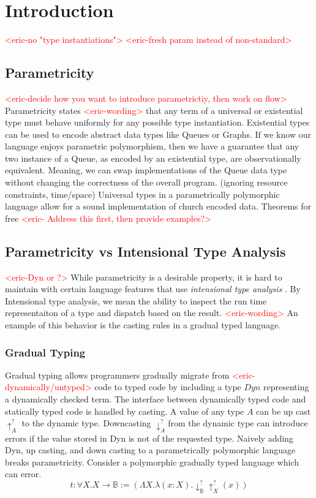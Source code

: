 \documentclass[acmsmall]{acmart}
\newcommand{\eric}[1]{\textcolor{red}{ <eric-#1> }}
\begin{document}
\maketitle

\section{Introduction}
\eric{no "type instantiations"}
\eric{fresh param instead of non-standard}
\subsection{Parametricity}
\eric{decide how you want to introduce parametrictiy, then work on flow}
Parametricity states \eric{wording}that any term of a universal or existential type must behave uniformly for any possible type instantiation.
Existential types can be used to encode abstract data types like Queues or Graphs. 
If we know our language enjoys parametric polymorphism, then we have a guarantee that any two instance of a Queue, as encoded by an existential type, are observationally equivalent.
Meaning, we can swap implementations of the Queue data type without changing the correctness of the overall program. (ignoring resource constraints, time/space)
Universal types in a parametrically polymorphic language allow for a sound implementation of church encoded data. 
Theorems for free
	\eric{
	Address this first, then provide examples?}

\subsection{Parametricity vs Intensional Type Analysis}
\eric{Dyn or ?}
While parametricity is a desirable property, it is hard to maintain with certain language features that use \textit{intensional type analysis} \cite{IntTypeAnalysis}. By Intensional type analysis, we mean the ability to inspect the run time representaiton of a type and dispatch based on the result. \eric{wording}An example of this behavior is the casting rules in a gradual typed language\cite{GradParam}.


\subsubsection{Gradual Typing}
Gradual typing allows programmers gradually migrate from \eric{dynamically/untyped} code to typed code by including a type $Dyn$ representing a dynamically checked term. 
The interface between dynamically typed code and statically typed code is handled by casting.
A value of any type $A$ can be up cast $\uparrow_A^?$ to the dynamic type.
Downcasting $\downarrow_A^?$from the dynamic type can introduce errors if the value stored in Dyn is not of the requested type.
Naively adding Dyn, up casting, and down casting to a parametrically polymorphic language breaks parametricity. 
Consider a polymorphic gradually typed language which can error.
$$t : \forall X. X \rightarrow \mathbb{B}:= (\Lambda X. \lambda (x : X). \downarrow_\mathbb{B}^?\uparrow_X^?(x))$$
\end{document}

